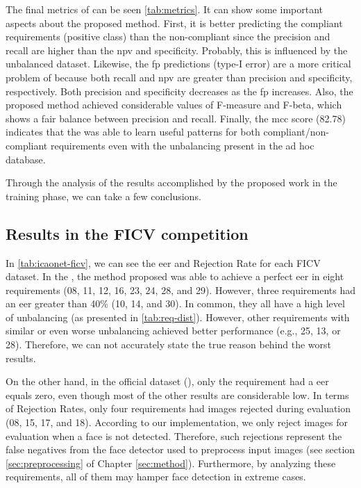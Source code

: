 The final metrics of \methodname can be seen \autoref{tab:metrics}. It can show some important aspects about the proposed method. First, it is better predicting the compliant requirements (positive class) than the non-compliant since the precision and recall are higher than the \acs{npv} and specificity. Probably, this is influenced by the unbalanced dataset. Likewise, the \acl{fp} predictions (type-I error) are a more critical problem of \methodname because both recall and \acs{npv} are greater than precision and specificity, respectively. Both precision and specificity decreases as the \acs{fp} increases. Also, the proposed method achieved considerable values of F-measure and F-beta, which shows a fair balance between precision and recall. Finally, the \acs{mcc} score (82.78) indicates that the \methodname was able to learn useful patterns for both compliant/non-compliant requirements even with the unbalancing present in the ad hoc database.

Through the analysis of the results accomplished by the proposed work in the training phase, we can take a few conclusions.




\subsection{Results in the FICV competition}

In \autoref{tab:icaonet-ficv}, we can see the \acl{eer} and Rejection Rate for each FICV dataset. In the \ficvtest, the method proposed was able to achieve a perfect \acs{eer} in eight requirements (08, 11, 12, 16, 23, 24, 28, and 29). However, three requirements had an \acs{eer} greater than 40\% (10, 14, and 30). In common, they all have a high level of unbalancing (as presented in \autoref{tab:req-dist}). However, other requirements with similar or even worse unbalancing achieved better performance (e.g., 25, 13, or 28). Therefore, we can not accurately state the true reason behind the worst results.

On the other hand, in the official dataset (\ficvofficial), only the \citeReq{\veiloverface} requirement had a \acs{eer} equals zero, even though most of the other results are considerable low. In terms of Rejection Rates, only four requirements had images rejected during evaluation (08, 15, 17, and 18). According to our implementation, we only reject images for evaluation when a face is not detected. Therefore, such rejections represent the false negatives from the face detector used to preprocess input images (see section \ref{sec:preprocessing} of Chapter \ref{sec:method}). Furthermore, by analyzing these requirements, all of them may hamper face detection in extreme cases. 

